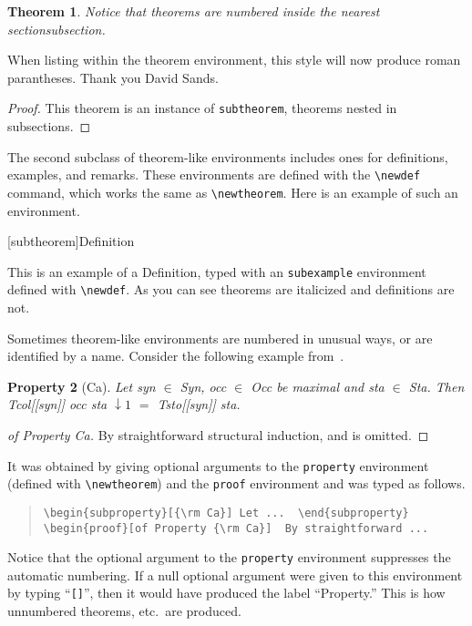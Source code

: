 \documentclass[hyperref]{acmtrans2e}
\begin{document}
\newtheorem{subtheorem}{Theorem}[subsection]
\begin{subtheorem}
Notice that theorems are numbered inside the nearest section\newline subsection.
\end{subtheorem}

When listing within the theorem environment, this style will now produce
roman parantheses. Thank you David Sands.

\begin{proof}	
This theorem is an instance of {\tt subtheorem}, theorems nested in
subsections.
\end{proof}


The second subclass of theorem-like environments includes ones for
definitions, examples, and remarks.  These environments are defined
with the \verb|\newdef| command, which works the same as
\verb|\newtheorem|.  Here
is an example of such an environment.

[subtheorem]{Definition}

\begin{subexample}
This is an example of a Definition, typed with an {\tt subexample}
environment defined with \verb|\newdef|.
As you can see theorems are italicized and definitions are not.
\end{subexample}

\newtheorem{subproperty}[subtheorem]{Property}

Sometimes theorem-like environments are numbered in unusual ways, or
are identified by a name.  Consider the following example
from~.
\begin{subproperty}[{\rm Ca}]
Let syn $\in$ Syn, occ $\in$ Occ be maximal and sta $\in$ Sta.  Then
Tcol\/{\rm [[}syn\/{\rm ]]} occ sta\hspace{-2pt} $\downarrow\!1$ $=$
Tsto\/{\rm [[}syn\/{\rm ]]} sta.
\end{subproperty}
\begin{proof}[of Property {\rm Ca}]
By straightforward structural induction, and is \linebreak
omitted.
\end{proof}
It was obtained by giving optional arguments to the
{\tt property} environment (defined with \verb|\newtheorem|)
and the {\tt proof} environment and was typed as follows.
\begin{quote}
\begin{verbatim}
\begin{subproperty}[{\rm Ca}] Let ...  \end{subproperty}
\begin{proof}[of Property {\rm Ca}]  By straightforward ...
\end{verbatim}
\end{quote}
Notice that the optional argument to the {\tt property} environment
suppresses the automatic numbering.  If a null optional argument
were given to this environment by typing ``{\tt []}'', then
it would have produced the label ``{\sc Property.}''  This is
how unnumbered theorems, etc.\ are produced.
\end{document}
